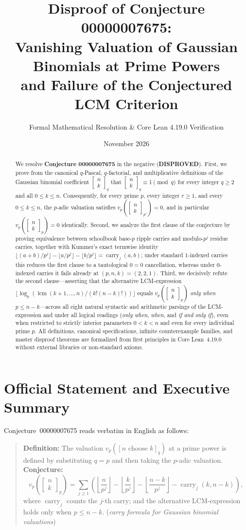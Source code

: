 \documentclass[11pt,a4paper]{article}
\title{\textbf{Disproof of Conjecture 00000007675:\\
Vanishing Valuation of Gaussian Binomials at Prime Powers\\
and Failure of the Conjectured LCM Criterion}}
\author{Formal Mathematical Resolution \& Core Lean 4.19.0 Verification}
\date{November 2026}
\theoremstyle{definition}
\theoremstyle{remark}
\newcommand{\qbinom}[3]{\begin{bmatrix} #1 \\ #2 \end{bmatrix}_{#3}}
\newcommand{\lcm}{\operatorname{lcm}}
\newcommand{\carry}{\operatorname{carry}}
\begin{document}
\maketitle

\begin{abstract}
We resolve \textbf{Conjecture 00000007675} in the negative (\textbf{DISPROVED}).
First, we prove from the canonical $q$-Pascal, $q$-factorial, and multiplicative
definitions of the Gaussian binomial coefficient $\qbinom{n}{k}{q}$ that
$\qbinom{n}{k}{q} \equiv 1 \pmod{q}$ for every integer $q \ge 2$ and all
$0 \le k \le n$. Consequently, for every prime $p$, every integer $r \ge 1$, and
every $0 \le k \le n$, the $p$-adic valuation satisfies
$v_p\!\left(\qbinom{n}{k}{p^r}\right) = 0$, and in particular
$v_p\!\left(\qbinom{n}{k}{p}\right) = 0$ identically.
Second, we analyze the first clause of the conjecture by proving equivalence between
schoolbook base-$p$ ripple carries and modulo-$p^j$ residue carries, together with
Kummer's exact termwise identity
$\lfloor (a+b)/p^j \rfloor - \lfloor a/p^j \rfloor - \lfloor b/p^j \rfloor = \carry_j(a,b)$;
under standard $1$-indexed carries this reduces the first clause to a tautological
$0 = 0$ cancellation, whereas under $0$-indexed carries it fails already at
$(p,n,k) = (2,2,1)$.
Third, we decisively refute the second clause---asserting that the alternative
LCM-expression $\lfloor \log_p(\lcm(k+1,\dots,n)/(k!(n-k)!))\rfloor$ equals
$v_p\!\left(\qbinom{n}{k}{p}\right)$ \emph{only when} $p \le n - k$---across all eight
natural syntactic and arithmetic parsings of the LCM-expression and under all logical
readings (\emph{only when}, \emph{when}, and \emph{if and only if}), even when
restricted to strictly interior parameters $0 < k < n$ and even for every individual
prime $p$. All definitions, canonical specifications, infinite counterexample
families, and master disproof theorems are formalized from first principles in Core
Lean~4.19.0 without external libraries or non-standard axioms.
\end{abstract}

\section{Official Statement and Executive Summary}

Conjecture~00000007675 reads verbatim in English as follows:

\begin{quote}
\textbf{Definition:} The valuation $v_p([n\text{ choose }k]_q)$ at a prime power is
defined by substituting $q=p$ and then taking the $p$-adic valuation.
\textbf{Conjecture:}
\[
  v_p\!\left(\qbinom{n}{k}{p}\right)
  = \sum_{j \ge 1} \left(
      \left\lfloor \frac{n}{p^j} \right\rfloor
      - \left\lfloor \frac{k}{p^j} \right\rfloor
      - \left\lfloor \frac{n-k}{p^j} \right\rfloor
      - \carry_j(k,n-k)
    \right),
\]
where $\carry_j$ counts the $j$-th carry; and the alternative LCM-expression holds
only when $p \le n - k$. (\emph{carry formula for Gaussian binomial valuations})
\end{quote}
\end{document}
